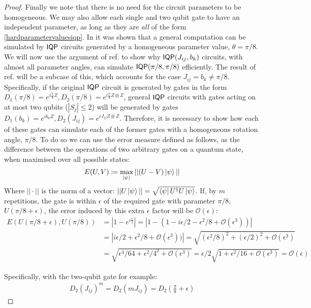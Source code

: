 \begin{proof}
Finally we note that there is no need for the circuit parameters to be homogeneous. We may also allow each single and two qubit gate to have an independent parameter, as long as they are \textit{all} of the form \eqref{hardparametervaluesiqp}.
In  it was shown that a general computation can be simulated by $\operatorname{\textsf{IQP}}$ circuits generated by a homogeneous parameter value, $\theta = \pi/8$. We will now use the argument of ref. to show why $\operatorname{\textsf{IQP}}(J_{ij}, b_{k})$ circuits, with almost all parameter angles, can simulate $\operatorname{\textsf{IQP}}(\pi/8, \pi/8)$ efficiently. The result of ref. will be a subcase of this, which accounts for the case $J_{ij} = b_k \neq \pi/8$.  Specifically, if the original $\operatorname{\textsf{IQP}}$ circuit is generated by gates in the form $D_1(\pi/8) = e^{i\frac{\pi}{8}Z}, D_2(\pi/8) = e^{i\frac{\pi}{8}Z \otimes Z}$, general $\operatorname{\textsf{IQP}}$ circuits with gates acting on at most two qubits ($|S_j|\leq 2$) will be generated by gates $D_1(b_{k}) = e^{ib_{k}Z}, D_2(J_{ij}) = e^{iJ_{ij} Z\otimes Z}$. Therefore, it is necessary to show how each of these gates can simulate each of the former gates with a homogeneous rotation angle, $\pi/8$. To do so we can use the error measure defined as follows, as the difference between the operations of two arbitrary gates on a quantum state, when maximised over all possible states:
\begin{align}
E(U, V)  \coloneqq \max\limits_{\ket{\psi}}||(U-V)\ket{\psi}|| \label{error}
\end{align}
Where $||\cdot||$ is the norm of a vector: $||U\ket{\psi}|| = \sqrt{\bra{\psi}U^\dagger U\ket{\psi}}$. If, by $m$ repetitions, the gate is within $\epsilon$ of the required gate with parameter $\pi/8$, $U(\pi/8+\epsilon)$, the error induced by this extra $\epsilon$ factor will be $\mathcal{O}(\epsilon)$:
\begin{align*}
E\left(U(\pi/8+\epsilon), U(\pi/8)\right) &= |1-e^{i\frac{\epsilon}{2}}| =|1-(1-i\epsilon/2-\epsilon^2/8+\mathcal{O}(\epsilon^3))|\\
&=|i\epsilon/2+\epsilon^2/8+\mathcal{O}(\epsilon^3))| = \sqrt{\left(\epsilon^2/8\right)^2 + \left(\epsilon/2\right)^2 +\mathcal{O}(\epsilon^3)}\\
 &= \sqrt{\epsilon^4/64 + \epsilon^2/4^2 +\mathcal{O}(\epsilon^3)} = \epsilon/2\sqrt{1+\epsilon^2/16 +\mathcal{O}(\epsilon^3)} = \mathcal{O}(\epsilon)
\end{align*}

Specifically, with the two-qubit gate for example:
\begin{align}
D_2(J_{ij})^m = D_2(mJ_{ij}) = D_2\left(\frac{\pi}{8}+\epsilon\right) \label{epsilonclose}
\end{align}


\end{proof}

